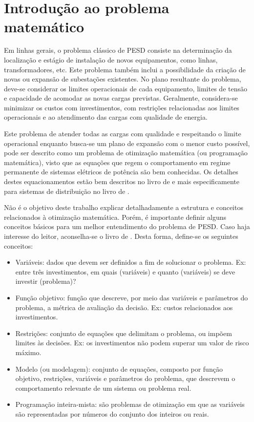 \section{Introdução ao problema matemático}


Em linhas gerais, o problema clássico de \ac{PESD} consiste na determinação da localização e estágio de instalação de novos equipamentos, como linhas, transformadores, etc. Este problema também inclui a possibilidade da criação de novas ou expansão de subestações existentes. No plano resultante do problema, deve-se considerar os limites operacionais de cada equipamento, limites de tensão e capacidade de acomodar as novas cargas previstas. Geralmente, considera-se minimizar os custos com investimentos, com restrições relacionadas aos limites operacionais e ao atendimento das cargas com qualidade de energia.

Este problema de atender todas as cargas com qualidade e respeitando o limite operacional enquanto busca-se um plano de expansão com o menor custo possível, pode ser descrito como um problema de otimização matemática (ou programação matemática), visto que as equações que regem o comportamento em regime permanente de sistemas elétricos de potência são bem conhecidas. Os detalhes destes equacionamentos estão bem descritos no livro de  e mais especificamente para sistemas de distribuição no livro de .

Não é o objetivo deste trabalho explicar detalhadamente a estrutura e conceitos relacionados à otimização matemática. Porém, é importante definir alguns conceitos básicos para um melhor entendimento do problema de \ac{PESD}. Caso haja interesse do leitor, aconselha-se o livro de . Desta forma, define-se os seguintes conceitos:

\begin{itemize}
    \item Variáveis: dados que devem ser definidos a fim de solucionar o problema. Ex: entre três investimentos, em quais (variáveis) e quanto (variáveis) se deve investir (problema)?
    
    \item Função objetivo: função que descreve, por meio das variáveis  e parâmetros do problema, a métrica de avaliação da decisão. Ex: custos relacionados aos investimentos.
    
    \item Restrições: conjunto de equações que delimitam o problema, ou impõem limites às decisões. Ex: os investimentos não podem superar um valor de risco máximo.
    
    \item Modelo (ou modelagem): conjunto de equações, composto por função objetivo, restrições, variáveis e parâmetros do problema, que descrevem o comportamento relevante de um sistema ou problema real.
    
    \item Programação inteira-mista: são problemas de otimização em que as variáveis são representadas por números do conjunto dos inteiros ou reais.
\end{itemize}


